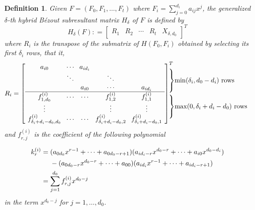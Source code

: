 \documentclass{article}
\newtheorem{definition}[theorem]{Definition}
\begin{document}
\begin{definition}\label{def:hb}
Given $F=(F_0,F_1,\ldots,F_t)$ where $F_i=\sum_{j=0}^{d_i}a_{ij}x^j$,  the generalized $\delta$-th hybrid B\'ezout subresultant matrix $H_{\delta}$ of $F$ is defined by
$${H_\delta }(F): = {\left[ {\begin{array}{*{20}{l}}{{R_1}}&{{R_2}}& \cdots &{{R_t}}&{{X_{\delta ,{d_0}}}}
\end{array}} \right]^T}$$
where $R_i$ is the transpose of the submatrix of $H(F_0,F_i)$ obtained by selecting its first $\delta_i$ rows, that it,
$$
\setlength{\arraycolsep}{4pt}
{R_i} = {\left[ {\begin{array}{*{20}{c}}
a_{i0}&\cdots &{{a_{i{d_i}}}}&{}&{}\\
&\ddots &{}& \ddots &{}\\
&&{{a_{i0}}}& \cdots &{{a_{i{d_i}}}}\\
\hline
{f_{1,{d_0}}^{(i)}}& \cdots & \cdots &{f_{1,2}^{(i)}}&{f_{1,1}^{(i)}}\\
 \vdots & & &\vdots & \vdots \\
{f_{{\delta _i} + {d_i} - {d_0},{d_0}}^{(i)}}& \cdots& \cdots  &{f_{{\delta _i} + {d_i} - {d_0},2}^{(i)}}&{f_{{\delta _i} + {d_i} - {d_0},1}^{(i)}}
\end{array}} \right]^T}
\hspace{-2em}\begin{array}{*{20}{l}}
{\left. {\begin{array}{*{20}{c}}
{}\\
{}\\
{}
\end{array}} \right\}}{\min ({\delta _i},{d_0} - {d_i})} \text{~rows}\\[15pt]
{\left. {\begin{array}{*{20}{c}}
{}\\
{}\\
{}
\end{array}} \right\}}{\max (0,{\delta _i} + {d_i} - {d_0})}\text{~rows}
\end{array}$$
and
$f^{(i)}_{r,j}$ is the  coefficient of the following polynomial


\begin{align}
  k_r^{(i)} &= ({a_{{0d_0}}}{x^{r - 1}} +  \cdots  + {a_{0d_0- r + 1}})({a_{{id_i} - r}}{x^{d_0- r}} +  \cdots  + {a_{i0}}{x^{d_0- {d_i}}})\notag\\
&\ \ \ \ - ({a_{0d_0- r}}{x^{d_0- r}} +  \cdots  + {a_{00}})({a_{{id_i}}}{x^{r - 1}} +  \cdots  + {a_{id_i- r + 1}})\label{eq:k_r}\\
&= \sum\limits_{j = 1}^{{d_{0}}} {f_{r,j}^{(i)}{x^{d_0- j}}}\notag
\end{align}
in the term $x^{d_{0}-j}$ for $j=1,\ldots,d_0$.
\end{definition}
\end{document}
